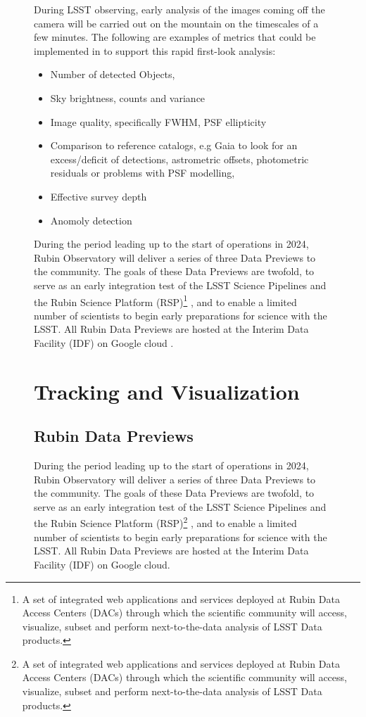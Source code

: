 \begin{figure}[!ht]
During LSST observing, early analysis of the images coming off the camera will be carried out on the mountain on the timescales of a few minutes. 
The following are examples of metrics that could be implemented in \faro to support this rapid first-look analysis:
\begin{itemize}
\item Number of detected Objects,
\item Sky brightness, counts and variance 
\item Image quality, specifically FWHM, PSF ellipticity
\item Comparison to reference catalogs, e.g Gaia to look for an excess/deficit of detections, astrometric offsets, photometric residuals or problems with PSF modelling,
\item Effective survey depth
\item Anomoly detection
\end{itemize}
During the period leading up to the start of operations in 2024, Rubin Observatory will deliver a series of three Data Previews to the community. 
The goals of these Data Previews are twofold, to serve as an early integration test of the LSST Science Pipelines and the Rubin Science Platform (RSP)\footnote{A set of integrated web applications and services deployed at Rubin Data Access Centers (DACs) through which the scientific community will access, visualize, subset and perform next-to-the-data analysis of LSST Data products.} \cite{lse-319}, and to enable a limited number of scientists to begin early preparations for science with the LSST.
All  Rubin Data Previews are hosted at the Interim Data Facility (IDF) on Google cloud\cite{2021arXiv211115030O} .

\section{Tracking and Visualization} \label{sec:tracking}

\subsection{Rubin Data Previews} \label{ssec:datapreviews}

During the period leading up to the start of operations in 2024, Rubin Observatory will deliver a series of three Data Previews to the community. 
The goals of these Data Previews are twofold, to serve as an early integration test of the LSST Science Pipelines and the Rubin Science Platform (RSP)\footnote{A set of integrated web applications and services deployed at Rubin Data Access Centers (DACs) through which the scientific community will access, visualize, subset and perform next-to-the-data analysis of LSST Data products.} \cite{lse-319}, and to enable a limited number of scientists to begin early preparations for science with the LSST.
All  Rubin Data Previews are hosted at the Interim Data Facility (IDF) on Google cloud\cite{2021arXiv211115030O}.


\end{figure}
